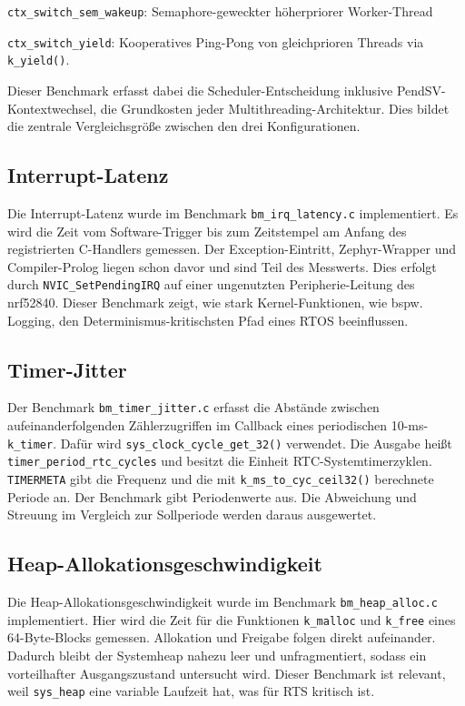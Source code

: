 \lstinline[style=fileinline]|ctx_switch_sem_wakeup|: Semaphore-geweckter h{\"o}herpriorer Worker-Thread

\lstinline[style=fileinline]|ctx_switch_yield|: Kooperatives Ping-Pong von gleichprioren Threads via \lstinline[style=fileinline]|k_yield()|.

Dieser Benchmark erfasst dabei die Scheduler-Entscheidung inklusive PendSV-Kontextwechsel, die Grundkosten jeder Multithreading-Architektur. Dies bildet die zentrale Vergleichsgr{\"o}{\ss}e zwischen den drei Konfigurationen.

\subsection{Interrupt-Latenz}
Die Interrupt-Latenz wurde im Benchmark \lstinline[style=fileinline]|bm_irq_latency.c| implementiert. Es wird die Zeit vom Software-Trigger bis zum Zeitstempel am Anfang des registrierten C-Handlers gemessen. Der Exception-Eintritt, Zephyr-Wrapper und Compiler-Prolog liegen schon davor und sind Teil des Messwerts. Dies erfolgt durch \lstinline[style=fileinline]|NVIC_SetPendingIRQ| auf einer ungenutzten Peripherie-Leitung des nrf52840. Dieser Benchmark zeigt, wie stark Kernel-Funktionen, wie bspw. Logging, den Determinismus-kritischsten Pfad eines RTOS beeinflussen.

\subsection{Timer-Jitter}
Der Benchmark \lstinline[style=fileinline]|bm_timer_jitter.c| erfasst die Abst{\"a}nde zwischen aufeinanderfolgenden Z{\"a}hlerzugriffen im Callback eines periodischen 10-ms-\lstinline[style=fileinline]|k_timer|. Daf{\"u}r wird \lstinline[style=fileinline]|sys_clock_cycle_get_32()| verwendet. Die Ausgabe hei{\ss}t \lstinline[style=fileinline]|timer_period_rtc_cycles| und besitzt die Einheit RTC-Systemtimerzyklen. \lstinline[style=fileinline]|TIMERMETA| gibt die Frequenz und die mit \lstinline[style=fileinline]|k_ms_to_cyc_ceil32()| berechnete Periode an. Der Benchmark gibt Periodenwerte aus. Die Abweichung und Streuung im Vergleich zur Sollperiode werden daraus ausgewertet.

\subsection{Heap-Allokationsgeschwindigkeit}
Die Heap-Allokationsgeschwindigkeit wurde im Benchmark \lstinline[style=fileinline]|bm_heap_alloc.c| implementiert. Hier wird die Zeit f{\"u}r die Funktionen \lstinline[style=fileinline]|k_malloc| und \lstinline[style=fileinline]|k_free| eines 64-Byte-Blocks gemessen. Allokation und Freigabe folgen direkt aufeinander. Dadurch bleibt der Systemheap nahezu leer und unfragmentiert, sodass ein vorteilhafter Ausgangszustand untersucht wird. Dieser Benchmark ist relevant, weil \lstinline[style=fileinline]|sys_heap| eine variable Laufzeit hat, was f{\"u}r RTS kritisch ist.

